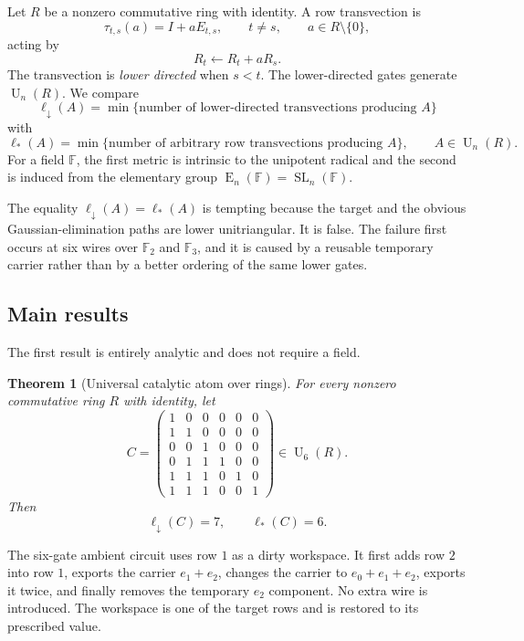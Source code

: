 \documentclass[11pt]{amsart}
\numberwithin{equation}{section}
\newtheorem{theorem}{Theorem}[section]
\theoremstyle{definition}
\theoremstyle{remark}
\newcommand{\F}{\mathbb F}
\newcommand{\SL}{\operatorname{SL}}
\newcommand{\Egrp}{\operatorname{E}}
\newcommand{\U}{\operatorname{U}}
\newcommand{\ellDown}{\ell_{\downarrow}}
\newcommand{\ellAll}{\ell_{*}}
\begin{document}
Let $R$ be a nonzero commutative ring with identity.  A row transvection is
\[
\tau_{t,s}(a)=I+aE_{t,s},
\qquad t\ne s,
\qquad a\in R\setminus\{0\},
\]
acting by
\[
R_t\longleftarrow R_t+aR_s.
\]
The transvection is \emph{lower directed} when $s<t$.  The lower-directed gates generate $\U_n(R)$.  We compare
\[
\ellDown(A)
 =\min\{\text{number of lower-directed transvections producing }A\}
\]
with
\[
\ellAll(A)
 =\min\{\text{number of arbitrary row transvections producing }A\},
\qquad A\in\U_n(R).
\]
For a field $\F$, the first metric is intrinsic to the unipotent radical and the second is induced from the elementary group $\Egrp_n(\F)=\SL_n(\F)$.

The equality $\ellDown(A)=\ellAll(A)$ is tempting because the target and the obvious Gaussian-elimination paths are lower unitriangular.  It is false.  The failure first occurs at six wires over $\F_2$ and $\F_3$, and it is caused by a reusable temporary carrier rather than by a better ordering of the same lower gates.

\subsection*{Main results}

The first result is entirely analytic and does not require a field.

\begin{theorem}[Universal catalytic atom over rings]\label{thm:universal-atom}
For every nonzero commutative ring $R$ with identity, let
\begin{equation}\label{eq:canonical-C}
C=
\begin{pmatrix}
1&0&0&0&0&0\\
1&1&0&0&0&0\\
0&0&1&0&0&0\\
0&1&1&1&0&0\\
1&1&1&0&1&0\\
1&1&1&0&0&1
\end{pmatrix}
\in\U_6(R).
\end{equation}
Then
\[
\ellDown(C)=7,
\qquad
\ellAll(C)=6.
\]
\end{theorem}

The six-gate ambient circuit uses row $1$ as a dirty workspace.  It first adds row $2$ into row $1$, exports the carrier $e_1+e_2$, changes the carrier to $e_0+e_1+e_2$, exports it twice, and finally removes the temporary $e_2$ component.  No extra wire is introduced.  The workspace is one of the target rows and is restored to its prescribed value.
\end{document}
